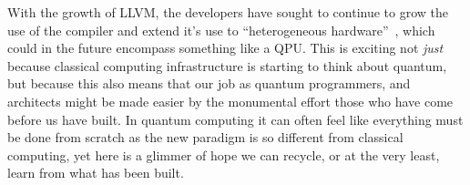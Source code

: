 With the growth of LLVM, the developers have sought to continue to grow the use of the compiler and extend it's use to ``heterogeneous hardware''~\cite{mlir}, which could in the future encompass something like a \ac{QPU}.
This is exciting not \emph{just} because classical computing infrastructure is starting to think about quantum, but because this also means that our job as quantum programmers, and architects might be made easier by the monumental effort those who have come before us have built.
In quantum computing it can often feel like everything must be done from scratch as the new paradigm is so different from classical computing, yet here is a glimmer of hope we can recycle, or at the very least, learn from what has been built.
